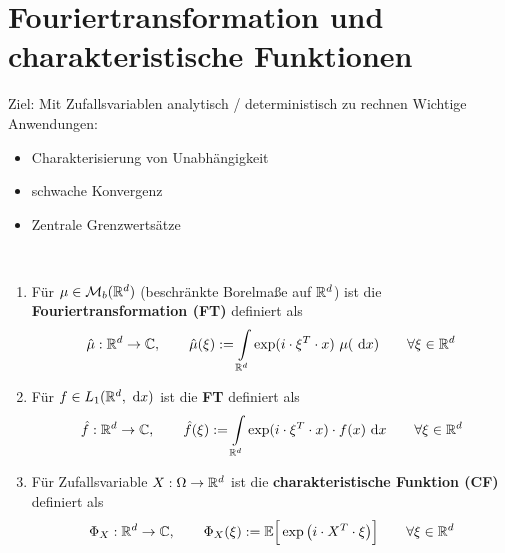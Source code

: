 
\chapter{Fouriertransformation und charakteristische Funktionen} %
Ziel: Mit Zufallsvariablen analytisch / deterministisch zu rechnen \nl
Wichtige Anwendungen:
\begin{itemize}
\item Charakterisierung von Unabhängigkeit
\item schwache Konvergenz
\item Zentrale Grenzwertsätze
\end{itemize}

\begin{defi}\
\begin{enumerate}[label=(\alph*)]
\item Für $\mu\in\mathcal{M}_b(\mathbb{R}^d)$ (beschränkte Borelmaße auf $\mathbb{R}^d$) ist die \textbf{Fouriertransformation (FT)} definiert als
\begin{align*}
\hat{\mu}:\mathbb{R}^d\to\mathbb{C},\qquad
\hat{\mu}(\xi):=\int\limits_{\mathbb{R}^d}\exp(i\cdot\xi^T\cdot x)~\mu(\text{ d} x)\qquad\forall\xi\in\mathbb{R}^d
\end{align*}
\item Für $f\in L_1(\mathbb{R}^d,\text{ d} x)$ ist die \textbf{FT} definiert als
\begin{align*}
\hat{f}:\mathbb{R}^d\to\mathbb{C},\qquad
\hat{f}(\xi):=\int\limits_{\mathbb{R}^d}\exp(i\cdot\xi^T\cdot x)\cdot f(x)\text{ d} x\qquad\forall\xi\in\mathbb{R}^d
\end{align*}
\item Für Zufallsvariable $X:\Omega\to\mathbb{R}^d$ ist die \textbf{charakteristische Funktion (CF)} definiert als
\begin{align*}
\Phi_X:\mathbb{R}^d\to\mathbb{C},\qquad
\Phi_X(\xi):=\mathbb{E}\Big[\exp\big(i\cdot X^T\cdot\xi\big)\Big]\qquad\forall\xi\in\mathbb{R}^d
\end{align*} 
\end{enumerate}
\end{defi}

